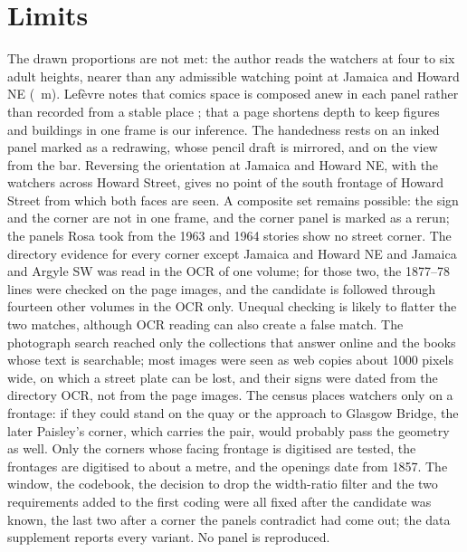 \documentclass[10pt,a4paper]{article}
\begin{document}
\section{Limits}\label{sec:limits}
The drawn proportions are not met: the author reads the watchers at four to six adult heights, nearer than any admissible watching point at Jamaica and Howard NE (\DnearJH~m). Lefèvre notes that comics space is composed anew in each panel rather than recorded from a stable place \citep[p.~160]{lefevre2008space}; that a page shortens depth to keep figures and buildings in one frame is our inference. The handedness rests on an inked panel marked as a redrawing, whose pencil draft is mirrored, and on the view from the bar. Reversing the orientation at Jamaica and Howard NE, with the watchers across Howard Street, gives no point of the south frontage of Howard Street from which both faces are seen. A composite set remains possible: the sign and the corner are not in one frame, and the corner panel is marked as a rerun; the panels Rosa took from the 1963 and 1964 stories show no street corner. The directory evidence for every corner except Jamaica and Howard NE and Jamaica and Argyle SW was read in the OCR of one volume; for those two, the 1877--78 lines were checked on the page images, and the candidate is followed through fourteen other volumes in the OCR only. Unequal checking is likely to flatter the two matches, although OCR reading can also create a false match. The photograph search reached only the collections that answer online and the books whose text is searchable; most images were seen as web copies about 1000 pixels wide, on which a street plate can be lost, and their signs were dated from the directory OCR, not from the page images. The census places watchers only on a frontage: if they could stand on the quay or the approach to Glasgow Bridge, the later Paisley's corner, which carries the pair, would probably pass the geometry as well. Only the corners whose facing frontage is digitised are tested, the frontages are digitised to about a metre, and the openings date from 1857. The window, the codebook, the decision to drop the width-ratio filter and the two requirements added to the first coding were all fixed after the candidate was known, the last two after a corner the panels contradict had come out; the data supplement reports every variant. No panel is reproduced.
\end{document}
